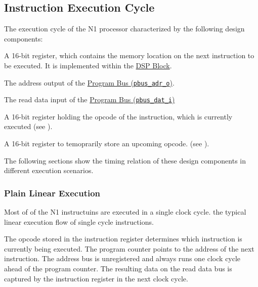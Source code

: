 \subsection{Instruction Execution Cycle}
\label{architecture:excyc}

The execution cycle of the N1 processor characterized by the following design components:
\begin{description}[style=nextline]

\item[\textbf{Program Counter}]
A 16-bit register, which contains the memory location on the next instruction to be executed.  
It is implemented within the \hyperref[architecture:comp:dsp]{DSP Block}.

\item[\textbf{Address Bus}]
The address output of the \hyperref[integration:if:pbus]{Program Bus (\texttt{pbus\_adr\_o})}.

\item[\textbf{Read Data Bus}]
The read data input of the \hyperref[integration:if:pbus]{Program Bus (\texttt{pbus\_dat\_i})}

\item[\textbf{Instruction Register}]
A 16-bit register holding the opcode of the instruction, which is currently executed (see ).

\item[\textbf{Instruction Stash Register}]
A 16-bit register to temoprarily store an upcoming opcode. (see ).

\end{description}

The following sections show the timing relation of these design components in different execution scenarios.


\subsubsection{Plain Linear Execution}
\label{architecture:excyc:linear}

Most of of the  N1 instructuins are executed in a single clock cycle.
 the typical linear execution flow of single cycle instructions.

The opcode stored in the instruction register determines which instruction is currently being executed.
The program counter points to the address of the next instruction.
The address bus is unregistered and always runs one clock cycle ahead of the program counter. 
The resulting data on the read data bus is captured by the instruction register in the next clock cycle.

